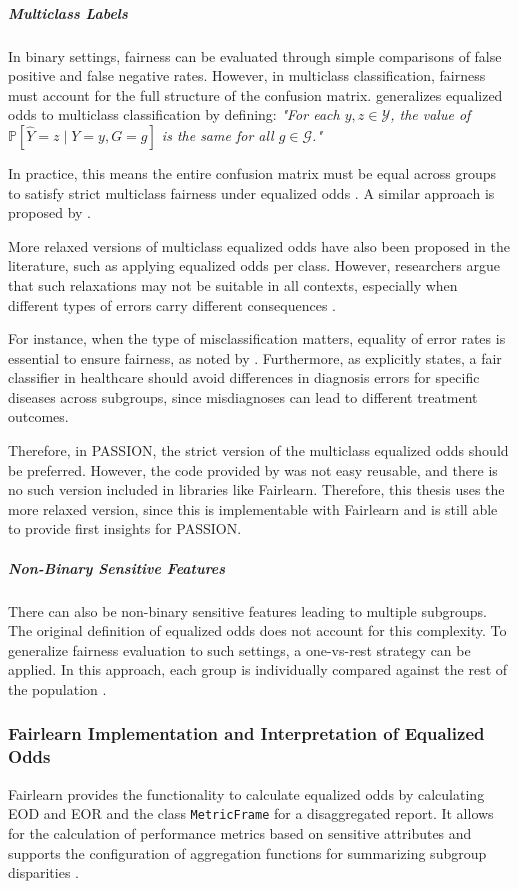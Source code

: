 \documentclass[12pt, a4paper, oneside]{book}   	%
\renewcommand{\paragraph}[1]{%
	\subsubsection*{#1}%
}
\begin{document}
		\subparagraph{Multiclass Labels}
		In binary settings, fairness can be evaluated through simple comparisons of false positive and false negative rates. However, in multiclass classification, fairness must account for the full structure of the confusion matrix. \textcite{Sabato_2024} generalizes equalized odds to multiclass classification by defining:
		\textit{"For each \( y, z \in \mathcal{Y} \), the value of \( \mathbb{P}[\hat{Y} = z \mid Y = y, G = g] \) is the same for all \( g \in \mathcal{G} \)."}
		
		In practice, this means the entire confusion matrix must be equal across groups to satisfy strict multiclass fairness under equalized odds \autocite{Sabato_2024}. A similar approach is proposed by \textcite{Putzel_2022}.
		
		More relaxed versions of multiclass equalized odds have also been proposed in the literature, such as applying equalized odds per class. However, researchers argue that such relaxations may not be suitable in all contexts, especially when different types of errors carry different consequences \autocites{Sabato_2024}{Putzel_2022}.
		
		For instance, when the type of misclassification matters, equality of error rates is essential to ensure fairness, as noted by \textcite{Putzel_2022}. Furthermore, as \textcite{Sabato_2024} explicitly states, a fair classifier in healthcare should avoid differences in diagnosis errors for specific diseases across subgroups, since misdiagnoses can lead to different treatment outcomes.
		
		Therefore, in PASSION, the strict version of the multiclass equalized odds should be preferred. However, the code provided by \textcite{Sabato_2024} was not easy reusable, and there is no such version included in libraries like \gls{Fairlearn}. Therefore, this thesis uses the more relaxed version, since this is implementable with \gls{Fairlearn} and is still able to provide first insights for PASSION.
		
		\subparagraph{Non-Binary Sensitive Features}
		There can also be non-binary sensitive features leading to multiple subgroups. The original definition of equalized odds does not account for this complexity. To generalize fairness evaluation to such settings, a one-vs-rest strategy can be applied. In this approach, each group is individually compared against the rest of the population \autocite{Nezami_2024}.
		
		\paragraph{Fairlearn Implementation and Interpretation of Equalized Odds}
		\gls{Fairlearn} provides the functionality to calculate equalized odds by calculating \gls{EOD} and \gls{EOR} and the class \texttt{MetricFrame} for a disaggregated report. It allows for the calculation of performance metrics based on sensitive attributes and supports the configuration of aggregation functions for summarizing subgroup disparities \autocite{Fairlearn_nodate}.
		
\end{document}
